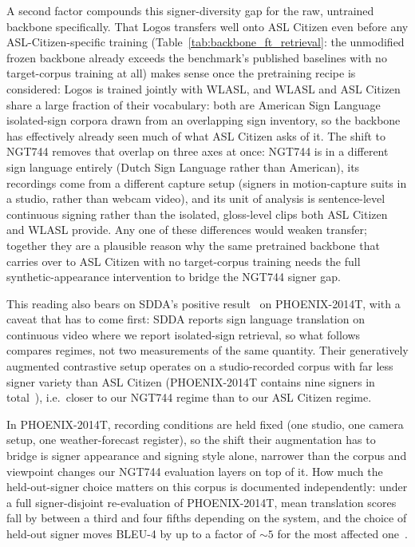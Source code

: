 A second factor compounds this signer-diversity gap for the raw, untrained
backbone specifically. That Logos transfers well onto ASL Citizen even
before any ASL-Citizen-specific training
(Table~\ref{tab:backbone_ft_retrieval}: the unmodified frozen backbone
already exceeds the benchmark's published baselines with no target-corpus
training at all)
makes sense once the pretraining recipe is considered: Logos is trained
jointly with WLASL, and WLASL and ASL Citizen share a large fraction of
their vocabulary: both are American Sign Language isolated-sign corpora
drawn from an overlapping sign inventory, so the backbone has effectively
already seen much of what ASL Citizen asks of it. The shift to NGT744 removes
that overlap on three axes at once: NGT744 is in a different sign
language entirely (Dutch Sign Language rather than American), its
recordings come from a different capture setup (signers in motion-capture
suits in a studio, rather than webcam video), and its unit of analysis is
sentence-level continuous signing rather than the isolated, gloss-level
clips both ASL Citizen and WLASL provide. Any one of these differences
would weaken transfer; together they are a plausible reason why the same
pretrained backbone that carries over to ASL Citizen with no
target-corpus training needs
the full synthetic-appearance intervention to bridge the NGT744 signer gap.

This reading also bears on SDDA's positive
result~\cite{fuSignerDiversitydrivenData2024b} on PHOENIX-2014T, with a
caveat that has to come first: SDDA reports sign language translation on
continuous video where we report isolated-sign retrieval, so what follows
compares regimes, not two measurements of the same quantity. Their
generatively augmented contrastive setup operates on a studio-recorded corpus
with far less signer variety than ASL Citizen (PHOENIX-2014T contains nine signers in
total~\cite{fuSignerDiversitydrivenData2024b}), i.e.\ closer to our NGT744
regime than to our ASL Citizen regime.

In PHOENIX-2014T, recording conditions are held fixed (one studio, one camera
setup, one weather-forecast register), so the shift their augmentation has
to bridge is signer appearance and signing style alone, narrower than the
corpus and viewpoint changes our NGT744 evaluation layers on top of it. How
much the held-out-signer choice matters on this corpus is documented
independently: under a full signer-disjoint re-evaluation of
PHOENIX-2014T, mean translation scores fall by between a third and four
fifths depending on the system, and the choice of held-out signer moves
BLEU-4 by up to a factor of ${\sim}5$ for the most affected
one~\cite{artiagaRethinkingSignLanguage2025}.
